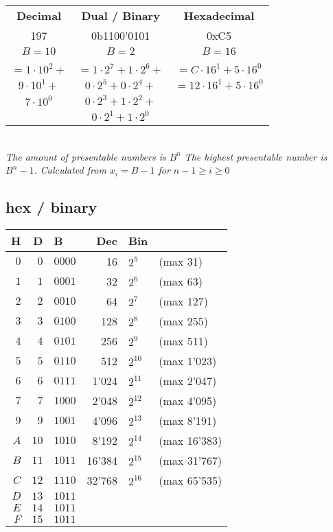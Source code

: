 \begin{tabular}{c|c|c}
    \hline
    \textbf{Decimal}  & \textbf{Dual / Binary}         & \textbf{Hexadecimal} \\
    197               & 0b1100'0101                    & 0xC5 \\
    $B=10$            & $B=2$                          & $B=16$ \\
    & & \\
    $=1 \cdot 10^2 +$ & $=1 \cdot 2^7 + 1 \cdot 2^6 +$ & $=C \cdot 16^1 + 5 \cdot 16^0$ \\
    $9 \cdot 10^1 +$  & $ 0 \cdot 2^5 + 0 \cdot 2^4 +$ & $=12 \cdot 16^1 + 5 \cdot 16^0$ \\
    $7 \cdot 10^0 $   & $ 0 \cdot 2^3 + 1 \cdot 2^2 +$ & \\
                      & $ 0 \cdot 2^1 + 1 \cdot 2^0 $  & \\
    \hline
\end{tabular}
\\
\textit{The amount of presentable numbers is $B^n$}
\textit{
    The highest presentable number is $B^n-1$.
    Calculated from $x_i = B - 1$ for $n-1 \geq i \geq 0$
}

\subsection{hex / binary}

\begin{tabular}{rrl|rll}
    H   & D   & B       &  Dec   & Bin \\
    \hline
    $0$ & $0$ & $0000$  & 16     & $2^5$    & (max 31)      \\
    $1$ & $1$ & $0001$  & 32     & $2^6$    & (max 63)      \\
    $2$ & $2$ & $0010$  & 64     & $2^7$    & (max 127)     \\
    $3$ & $3$ & $0100$  & 128    & $2^8$    & (max 255)     \\
    $4$ & $4$ & $0101$  & 256    & $2^9$    & (max 511)     \\
    $5$ & $5$ & $0110$  & 512    & $2^{10}$ & (max 1'023)   \\
    $6$ & $6$ & $0111$  & 1'024  & $2^{11}$ & (max 2'047)   \\
    $7$ & $7$ & $1000$  & 2'048  & $2^{12}$ & (max 4'095)   \\
    $9$ & $9$ & $1001$  & 4'096  & $2^{13}$ & (max 8'191)   \\
    $A$ & $10$ & $1010$ & 8'192  & $2^{14}$ & (max 16'383)  \\
    $B$ & $11$ & $1011$ & 16'384 & $2^{15}$ & (max 31'767)  \\
    $C$ & $12$ & $1110$ & 32'768 & $2^{16}$ & (max 65'535)  \\
    $D$ & $13$ & $1011$ & \\
    $E$ & $14$ & $1011$ & \\
    $F$ & $15$ & $1011$ & \\
\end{tabular}


